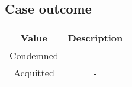 \documentclass{article}
\begin{document}
\subsection{Case outcome}
\begin{table}[h]
    \begin{center}
        \begin{tabular}{c|c}
            \toprule
            \textbf{Value} &
            \textbf{Description} \\
            \midrule
            Condemned      & -   \\
            Acquitted      & -   \\
            \bottomrule
        \end{tabular}
    \end{center}
\end{table}
\end{document}
